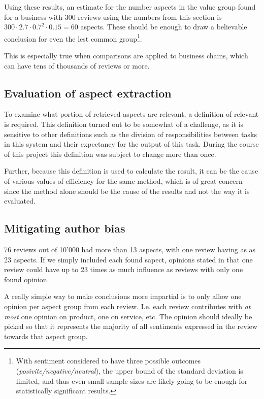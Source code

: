 \documentclass[a4paper,11pt]{kth-mag}
\newcommand{\numValueAspects}{60}
\begin{document}
Using these results, an estimate for the number aspects in the value group found for a business
with 300 reviews using the numbers from this section is $300 \cdot 2.7 \cdot 0.7^2 \cdot 0.15 =
\numValueAspects $ aspects.
These should be enough to draw a believable conclusion for even the lest common group\footnote{With sentiment considered to have three possible outcomes (\emph{posivite/negative/neutral}), the upper bound of the standard deviation is limited, and thus even small sample sizes are likely going to be enough for statistically significant results.}.

This is especially true when comparisons are applied to business chains, which can have
tens of thousands of reviews or more.


\subsection{Evaluation of aspect extraction}
\label{subsec:aspect_eval}
To examine what portion of retrieved aspects are relevant, a definition of relevant
is required. This definition turned out to be somewhat of a challenge, as it is sensitive
to other definitions such as the division of responsibilities between tasks
in this system and their expectancy for the output of this task.
During the course of this project this definition was subject to change more than once.

Further, because this definition is used to calculate the result, it can be the cause of
various values of efficiency for the same method, which is of great concern
since the method alone should be the cause of the results and not the way it is evaluated.


\subsection{Mitigating author bias}
76 reviews out of 10'000 had more than 13 aspects, with one review having as  as 23 aspects.
If we simply included each found sapect, opinions stated in that one review could have up to
23 times as much influence as reviews with only one found opinion.

A really simple way to make conclusions more impartial is to only allow one
opinion per aspect group from each review.
I.e. each review contributes with \emph{at most} one opinion on product, one on service, etc.
The opinion should ideally be picked so that it represents the majority of
all sentiments expressed in the review towards that aspect group.
\end{document}
